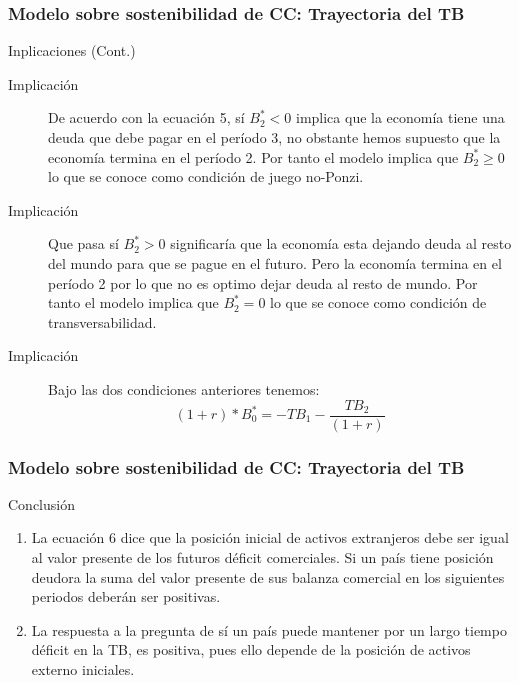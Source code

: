\documentclass[10pt, xcolor=table, x11names]{beamer}
\begin{document}
\begin{frame}[label=MODELO2]
	\frametitle{{\normalsize Modelo sobre sostenibilidad de CC: Trayectoria del TB} {}}
	\begin{block} {Inplicaciones (Cont.)}
		\begin{description}
			\item[Implicación] De acuerdo con la ecuación 5, sí $B_{2}^{*}<0$ implica que la economía tiene una deuda que debe pagar en el período 3, no obstante hemos supuesto que la economía termina en el período 2. Por tanto el modelo implica que $B_{2}^{*}\geq0 $ lo que se conoce como condición de juego no-Ponzi.
			\item[Implicación]  Que pasa sí $B_{2}^{*}>0 $ significaría que la economía esta dejando deuda al resto del mundo para que se pague en el futuro. Pero la economía termina en el período 2 por lo que no es optimo dejar deuda al resto de mundo.  Por tanto el modelo implica que $B_{2}^{*}=0 $ lo que se conoce como condición de transversabilidad.
			\item[Implicación]  Bajo las dos condiciones anteriores tenemos:
			\begin{equation}
			(1+r)*B_{0}^{*}= -TB_{1}-\frac{TB_{2}}{(1+r)}
			\end{equation}
		\end{description}
	\end{block}		
\end{frame}	

\begin{frame}[label=MODELO2]
	\frametitle{{\normalsize Modelo sobre sostenibilidad de CC: Trayectoria del TB} {}}
	\begin{block} {Conclusión}
	\begin{enumerate}
		\item La ecuación 6 dice que la posición inicial de activos extranjeros debe ser igual al valor presente de los futuros déficit comerciales. Si un país tiene posición deudora la suma del valor presente de sus balanza comercial en los siguientes periodos deberán ser positivas.
		\item La respuesta a la pregunta de sí un país puede mantener por un largo tiempo déficit en la TB, es positiva, pues ello depende de la posición de activos externo iniciales. 
		
	\end{enumerate}	
	\end{block}		
\end{frame}	
\end{document}
